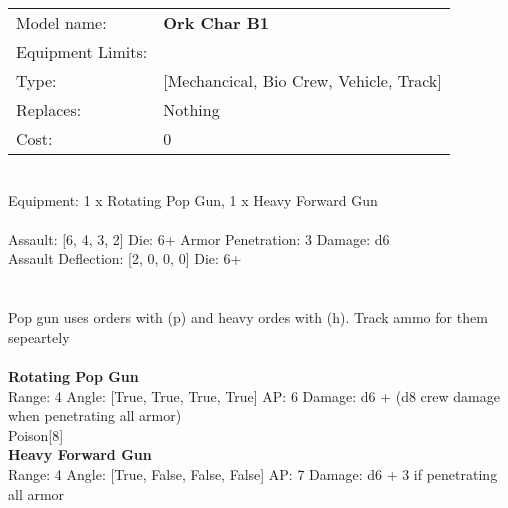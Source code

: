 \noindent
\begin{tabular}{ll}
Model name: &{\bf Ork Char B1 } \\
Equipment Limits: & \\
Type: &[Mechancical, Bio Crew, Vehicle, Track] \\
Replaces: &Nothing \\
Cost: & 0\\
\end{tabular}
\ \\
Equipment: 1 x Rotating Pop Gun, 1 x Heavy Forward Gun \\
\ \\
Assault: [6, 4, 3, 2] Die: 6+ Armor Penetration: 3 Damage: d6 \\
Assault Deflection: [2, 0, 0, 0] Die: 6+\\
\\ 
 
\ \\
Pop gun uses orders with (p) and heavy ordes with (h). Track ammo for them sepeartely\\ 

\ \\
{\bf Rotating Pop Gun } \\



Range: 4  Angle: [True, True, True, True] AP: 6 Damage: d6 + (d8 crew damage when penetrating all armor) \\
Poison[8]\\ 




{\bf Heavy Forward Gun } \\



Range: 4  Angle: [True, False, False, False] AP: 7 Damage: d6 + 3 if penetrating all armor \\




 
\ \\













